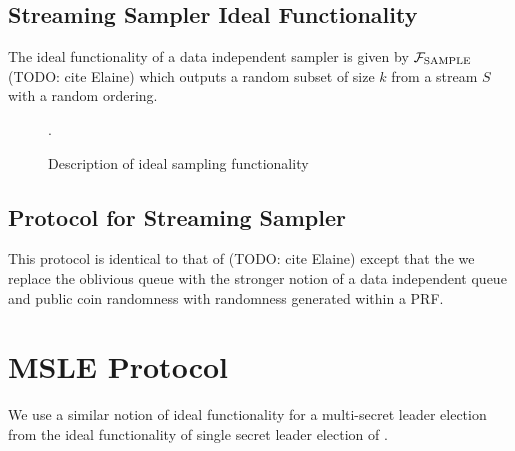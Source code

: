 \subsection*{Streaming Sampler Ideal Functionality}
The ideal functionality of a data independent sampler is given by $\mathcal{F}_{\text{SAMPLE}}$ (TODO: cite Elaine)
which outputs a random subset of size $k$ from a stream $S$ with a random ordering.

\begin{figure}[ht]
	\centering
	\caption{Description of ideal sampling functionality}.
	\label{fig:samplerIdeal}
\end{figure}
%

\subsection*{Protocol for Streaming Sampler}
This protocol is identical to that of (TODO: cite Elaine) except that the 
we replace the oblivious queue with the stronger notion of a data independent queue and public coin randomness
with randomness generated within a PRF.

\section{MSLE Protocol}
\label{sec:msle_protocol}
We use a similar notion of ideal functionality for a multi-secret leader election from the ideal
functionality of single secret leader election of .

